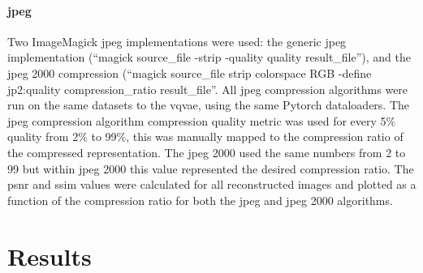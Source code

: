 \documentclass[review]{elsarticle}
\begin{document}
    
\paragraph{\gls{jpeg}} Two ImageMagick \gls{jpeg} implementations were used: the generic \gls{jpeg} implementation (``magick {source\_file} -strip -quality {quality} {result\_file}''),
 and the \gls{jpeg} 2000 compression (``magick {source\_file} \-strip \-colorspace RGB -define jp2:quality {compression\_ratio} {result\_file}''. All \gls{jpeg} compression algorithms were run on the same datasets to the \gls{vqvae}, using the same Pytorch dataloaders. %
 The \gls{jpeg} compression algorithm compression quality metric was used for every 5\% quality from 2\% to 99\%, this was manually mapped to the compression ratio of the compressed representation. The \gls{jpeg} 2000 used the same numbers from 2 to 99 but within \gls{jpeg} 2000 this value represented the desired compression ratio. The \gls{psnr} and \gls{ssim} values were calculated for all reconstructed images and plotted as a function of the compression ratio for both the \gls{jpeg} and \gls{jpeg} 2000 algorithms.

\section{Results}
\end{document}
